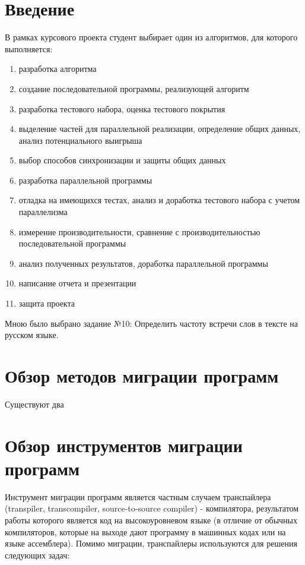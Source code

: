 \section{Введение}
В рамках курсового проекта студент выбирает один из алгоритмов, для которого выполняется:
\begin{enumerate}
\item разработка алгоритма
\item создание последовательной программы, реализующей алгоритм
\item разработка тестового набора, оценка тестового покрытия
\item выделение частей для параллельной реализации, определение общих данных, анализ потенциального выигрыша
\item выбор способов синхронизации и защиты общих данных
\item разработка параллельной программы
\item отладка на имеющихся тестах, анализ и доработка тестового набора с учетом параллелизма
\item измерение производительности, сравнение с производительностью последовательной программы
\item анализ полученных результатов, доработка параллельной программы
\item написание отчета и презентации
\item защита проекта
\end{enumerate}

Мною было выбрано задание №10: Определить частоту встречи слов в тексте на русском языке.
\section{Обзор методов миграции программ}
Существуют два

\section{Обзор инструментов миграции программ}
Инструмент миграции программ является частным случаем транспайлера (transpiler, transcompiler, source-to-source compiler) - компилятора, результатом работы которого является код на высокоуровневом языке (в отличие от обычных компиляторов, которые на выходе дают программу в машинных кодах или на языке ассемблера). Помимо миграции, транспайлеры используются для решения следующих задач:


